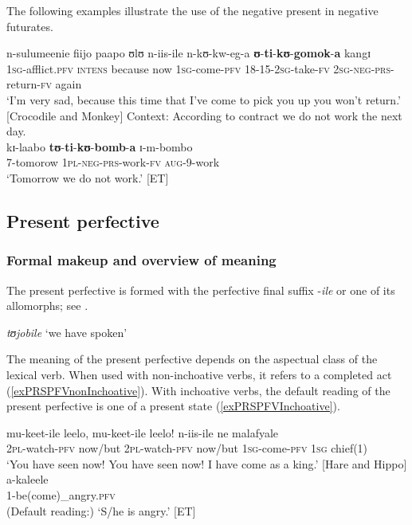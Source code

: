 The following examples illustrate the use of the negative present in negative futurates.
\begin{exe}
\ex \gll n-sulumeenie fiijo paapo ʊlʊ n-iis-ile n-kʊ-kw-eg-a \textbf{ʊ}-\textbf{ti}-\textbf{kʊ}-\textbf{gomok}-\textbf{a} kangɪ\\
\textsc{1sg}-afflict.\textsc{pfv} \textsc{intens} because now \textsc{1sg}-come-\textsc{pfv} 18-15-\textsc{2sg}-take-\textsc{fv} \textsc{2sg}-\textsc{neg}-\textsc{prs}-return-\textsc{fv} again\\
\glt \lq I'm very sad, because this time that I've come to pick you up you won't return.' [Crocodile and Monkey]
\ex Context: According to contract we do not work the next day.\\
\gll kɪ-laabo \textbf{tʊ}-\textbf{ti}-\textbf{kʊ}-\textbf{bomb}-\textbf{a} ɪ-m-bombo\\
7-tomorow \textsc{1pl}-\textsc{neg}-\textsc{prs}-work-\textsc{fv} \textsc{aug}-9-work\\
\glt `Tomorrow we do not work.' [ET]
\end{exe}

\subsection{Present perfective}\label{PresentPerfective}
\subsubsection{Formal makeup and overview of meaning}\label{PresentPerfectiveIntroduction}
The present perfective is formed with the perfective final suffix -\textit{ile} or one of its allomorphs; see .

\begin{exe}
\ex \label{exPRSPFVEinstiegsbeispiel} \textit{tʊjobile} \lq we have spoken'
\end{exe}

The meaning of the present perfective depends on the aspectual class of the lexical verb. When used with non-inchoative verbs, it refers to a completed act (\ref{exPRSPFVnonInchoative}). With inchoative verbs, the default reading of the present perfective is one of a present state (\ref{exPRSPFVInchoative}).

\begin{exe}
\ex \label{exPRSPFVnonInchoative} \gll mu-keet-ile leelo, mu-keet-ile leelo! n-iis-ile ne malafyale\\
\textsc{2pl}-watch-\textsc{pfv} now/but \textsc{2pl}-watch-\textsc{pfv} now/but \textsc{1sg}-come-\textsc{pfv} \textsc{1sg} chief(1)\\
\glt `You have seen now! You have seen now! I have come as a king.' [Hare and Hippo]
\ex \label{exPRSPFVInchoative} \gll a-kaleele\\
1-be(come)\_angry.\textsc{pfv}\\
\glt (Default reading:) \lq S/he is angry.' [ET]
\end{exe}

